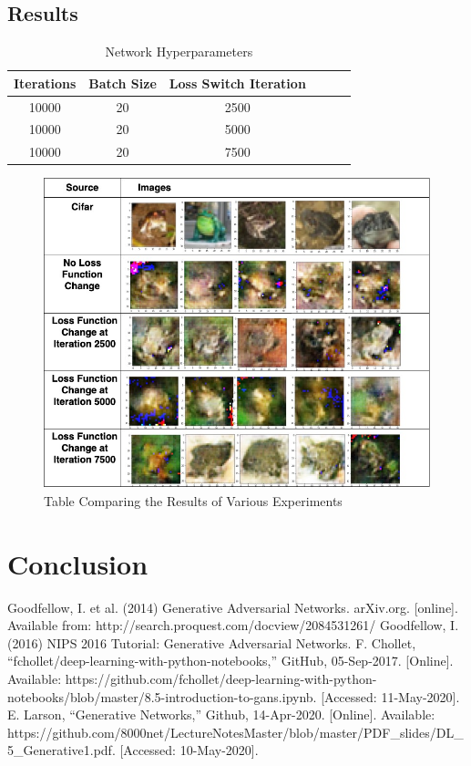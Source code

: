 \documentclass[conference]{IEEEtran}
\begin{document}
\subsection{Results}
\begin{table}[H]
\centering
\caption{Network Hyperparameters }
\begin{tabular}{|c|c|c|c|c|c|}
\hline
 Iterations & Batch Size & Loss Switch Iteration   \\
\hline
10000 & 20 & 2500 \\
\hline
10000 & 20 & 5000 \\
\hline
10000 & 20 & 7500 \\
\hline
\end{tabular}
\end{table}
\begin{figure}[h]
\includegraphics[width=\linewidth]{image_compare.jpg}
\caption{Table Comparing the Results of Various Experiments}
\end{figure}
\section{Conclusion}

\begin{thebibliography}{00}
 Goodfellow, I. et al. (2014) Generative Adversarial Networks. arXiv.org. [online]. Available from: http://search.proquest.com/docview/2084531261/
 Goodfellow, I. (2016) NIPS 2016 Tutorial: Generative Adversarial Networks.
 F. Chollet, “fchollet/deep-learning-with-python-notebooks,” GitHub, 05-Sep-2017. [Online]. Available: https://github.com/fchollet/deep-learning-with-python-notebooks/blob/master/8.5-introduction-to-gans.ipynb. [Accessed: 11-May-2020].
 E. Larson, “Generative Networks,” Github, 14-Apr-2020. [Online]. Available: https://github.com/8000net/LectureNotesMaster/blob/master/PDF\_slides/DL\_5\_Generative1.pdf. [Accessed: 10-May-2020].

\end{thebibliography}
\end{document}

